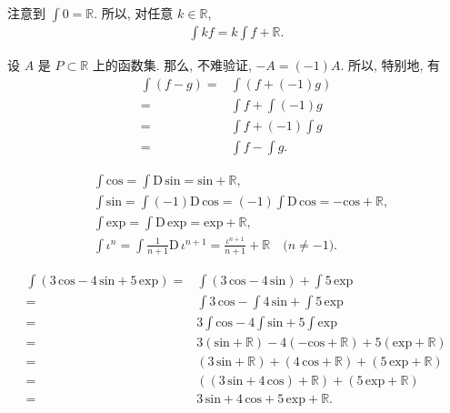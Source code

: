 \begin{remark}
    注意到 $\int {0} = \mathbb{R}$.
    所以, 对任意 $k \in \mathbb{R}$,
    \begin{align*}
        \int {kf} = k\int {f} + \mathbb{R}.
    \end{align*}
\end{remark}

\begin{example}
    设 $A$ 是 $P \subset \mathbb{R}$ 上的函数集.
    那么, 不难验证, $-A = (-1)A$.
    所以, 特别地, 有
    \begin{align*}
        \int {(f - g)}
        = {} & \int {(f + (-1)g)}      \\
        = {} & \int {f} + \int {(-1)g} \\
        = {} & \int {f} + (-1)\int {g} \\
        = {} & \int {f} - \int {g}.
    \end{align*}
\end{example}

\begin{example}
    \begin{align*}
         & \int {\mathrm{cos}} = \int {\mathrm{D}\,\mathrm{sin}} = \mathrm{sin} + \mathbb{R},                                               \\
         & \int {\mathrm{sin}} = \int {(-1)\mathrm{D}\,\mathrm{cos}} = (-1)\int {\mathrm{D}\,\mathrm{cos}} = -\mathrm{cos} + \mathbb{R},    \\
         & \int {\mathrm{exp}} = \int {\mathrm{D}\,\mathrm{exp}} = \mathrm{exp} + \mathbb{R},                                               \\
         & \int {\iota^n} = \int {\frac{1}{n+1} \mathrm{D}\,\iota^{n+1}} = \frac{\iota^{n+1}}{n+1} + \mathbb{R} \quad \text{($n \neq -1$)}.
    \end{align*}
\end{example}

\begin{example}
    \begin{align*}
        \int {(3\,\mathrm{cos} - 4\,\mathrm{sin} + 5\,\mathrm{exp})}
        = {} & \int {(3\,\mathrm{cos} - 4\,\mathrm{sin})} + \int {5\,\mathrm{exp}}                              \\
        = {} & \int {3\,\mathrm{cos}} - \int {4\,\mathrm{sin}} + \int {5\,\mathrm{exp}}                         \\
        = {} & 3\int {\mathrm{cos}} - 4\int {\mathrm{sin}} + 5\int {\mathrm{exp}}                               \\
        = {} & 3(\mathrm{sin} + \mathbb{R}) - 4(-\mathrm{cos} + \mathbb{R}) + 5(\mathrm{exp} + \mathbb{R})      \\
        = {} & (3\,\mathrm{sin} + \mathbb{R}) + (4\,\mathrm{cos} + \mathbb{R}) + (5\,\mathrm{exp} + \mathbb{R}) \\
        = {} & ((3\,\mathrm{sin} + 4\,\mathrm{cos}) + \mathbb{R}) + (5\,\mathrm{exp} + \mathbb{R})              \\
        = {} & 3\,\mathrm{sin} + 4\,\mathrm{cos} + 5\,\mathrm{exp} + \mathbb{R}.
    \end{align*}
\end{example}

